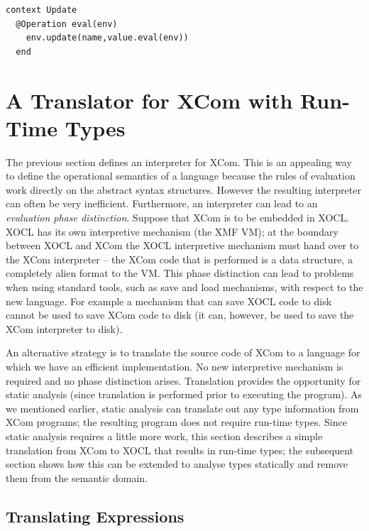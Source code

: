 \documentclass{article}
\begin{document}
\begin{verbatim}
context Update
  @Operation eval(env)
    env.update(name,value.eval(env))
  end
\end{verbatim}

\section{A Translator for XCom with Run-Time Types}

The previous section defines an interpreter for XCom. This is an appealing way to define
the operational semantics of a language because the rules of evaluation work directly on 
the abstract syntax structures. However the resulting interpreter can often be very
inefficient. Furthermore, an interpreter can lead to an {\em evaluation phase distinction}.
Suppose that XCom is to be embedded in XOCL. XOCL has its own interpretive mechanism (the XMF VM);
at the boundary between XOCL and XCom the XOCL interpretive mechanism must hand over to
the XCom interpreter -- the XCom code that is performed is a data structure, a completely
alien format to the VM. This phase distinction can lead to problems when using standard
tools, such as save and load mechanisms, with respect to the new language. For example a
mechanism that can save XOCL code to disk cannot be used to save XCom code to disk (it can,
however, be used to save the XCom interpreter to disk).

An alternative strategy is to translate the source code of XCom to a language for which we have 
an efficient implementation.  No new interpretive mechanism is required and no phase distinction 
arises. Translation provides the opportunity for static analysis (since translation is performed 
prior to executing the program). As we mentioned earlier, static analysis can translate out any
type information from XCom programs; the resulting program does not require run-time types.
Since static analysis requires a little more work, this section describes a simple
translation from XCom to XOCL that results in run-time types; the subsequent section shows
how this can be extended to analyse types statically and remove them from the semantic
domain.

\subsection{Translating Expressions}
\end{document}
